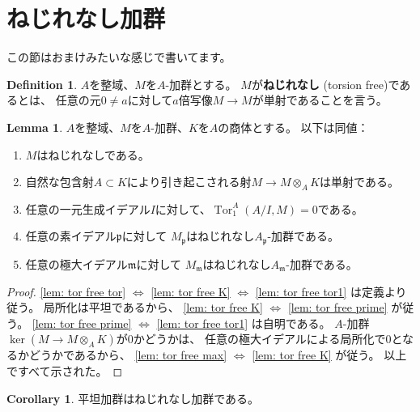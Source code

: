 \documentclass[uplatex]{jsarticle}
\theoremstyle{definition}
\newtheorem{cor}[cor]{Corollary}
\newtheorem{lem}[lem]{Lemma}
\newtheorem{defi}[defi]{Definition}
\DeclareMathOperator{\Tor}{\mathrm{Tor}}
\begin{document}
\section{ねじれなし加群}

この節はおまけみたいな感じで書いてます。


\begin{defi}
  \(A\)を整域、\(M\)を\(A\)-加群とする。
  \(M\)が\textbf{ねじれなし} (torsion free)であるとは、
  任意の元\(0\neq a\)に対して\(a\)倍写像\(M\to M\)が単射であることを言う。
\end{defi}

\begin{lem}\label{lem: tor free}
  \(A\)を整域、\(M\)を\(A\)-加群、\(K\)を\(A\)の商体とする。
  以下は同値：
  \begin{enumerate}
    \item \label{lem: tor free tor}
    \(M\)はねじれなしである。
    \item \label{lem: tor free K}
    自然な包含射\(A\subset K\)により引き起こされる射\(M\to M\otimes_AK\)は単射である。
    \item \label{lem: tor free tor1}
    任意の一元生成イデアル\(I\)に対して、\(\Tor_1^A(A/I,M)=0\)である。
    \item \label{lem: tor free prime}
    任意の素イデアル\(\mathfrak{p}\)に対して
    \(M_{\mathfrak{p}}\)はねじれなし\(A_{\mathfrak{p}}\)-加群である。
    \item \label{lem: tor free max}
    任意の極大イデアル\(\mathfrak{m}\)に対して
    \(M_{\mathfrak{m}}\)はねじれなし\(A_{\mathfrak{m}}\)-加群である。
  \end{enumerate}
\end{lem}

\begin{proof}
  \ref{lem: tor free tor} \(\Leftrightarrow\) \ref{lem: tor free K}
  \(\Leftrightarrow\) \ref{lem: tor free tor1}
  は定義より従う。
  局所化は平坦であるから、
  \ref{lem: tor free K} \(\Leftrightarrow\) \ref{lem: tor free prime}
  が従う。
  \ref{lem: tor free prime} \(\Leftrightarrow\) \ref{lem: tor free tor1}
  は自明である。
  \(A\)-加群\(\ker(M\to M\otimes_AK)\)が\(0\)かどうかは、
  任意の極大イデアルによる局所化で\(0\)となるかどうかであるから、
  \ref{lem: tor free max} \(\Leftrightarrow\) \ref{lem: tor free K}
  が従う。
  以上ですべて示された。
\end{proof}

\begin{cor}
  平坦加群はねじれなし加群である。
\end{cor}
\end{document}

